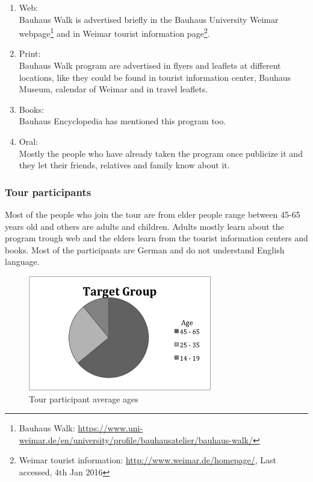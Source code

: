 \begin {enumerate}

\item	Web: \\
Bauhaus Walk is advertised briefly in the Bauhaus University Weimar webpage\footnote{Bauhaus Walk: \url{ https://www.uni-weimar.de/en/university/profile/bauhausatelier/bauhaus-walk/}} and in Weimar tourist information page\footnote{Weimar tourist information: \url{http://www.weimar.de/homepage/}, Last accessed, 4th Jan 2016}.

\item	Print: \\
Bauhaus Walk program are advertised in flyers and leaflets at different locations, like they could be found in tourist information center, Bauhaus Museum, calendar of Weimar and in travel leaflets. 

\item	Books: \\
Bauhaus Encyclopedia has mentioned this program too. 

\item	Oral: \\
Mostly the people who have already taken the program once publicize it and they let their friends, relatives and family know about it.
\end{enumerate}


\subsubsection{Tour participants}
Most of the people who join the tour are from elder people range between 45-65 years old and others are adults and children. Adults mostly learn about the program trough web and the elders learn from the tourist information centers and books.  Most of the participants are German and do not understand English language.

\begin{figure}[H]
    \centering
    \includegraphics[width=8cm, height=5cm]{Figures/4/target_group}%
    \caption{Tour participant average ages}%
    \label{fig:target_group}%
\end{figure}


